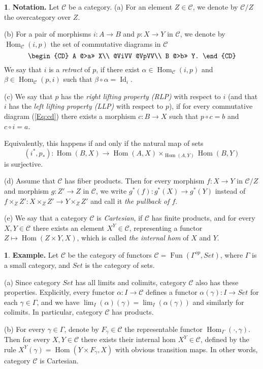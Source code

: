 \documentclass[12pt]{amsart}
\theoremstyle{plain}
\theoremstyle{definition}
\newtheorem{Emp}[Thm]{}
\numberwithin{equation}{section}
\newcommand{\cal}[1]{\mathcal{#1}}
\newcommand{\C}[1]{\cal#1}
\newcommand{\form}[1]{(\ref{Eq:#1})}
\newcommand{\Gm}{\Gamma}
\newcommand{\gm}{\gamma}
\newcommand{\al}{\alpha}
\newcommand{\Fun}{\operatorname{Fun}}
\newcommand{\Id}{\operatorname{Id}}
\newcommand{\Hom}{\operatorname{Hom}}
\begin{document}
\begin{Emp} \label{E:rlp}
{\bf Notation.} Let $\C{C}$ be a category. (a) For an element $Z\in\C{C}$, we denote by 
$\C{C}/Z$ the overcategory over $Z$. 

(b) For a pair of
morphisms $i:A\to B$ and $p:X\to Y$ in $\C{C}$, we denote by
$\Hom_{\C{C}}(i,p)$ the set of commutative diagrams in ${\C{C}}$
%
\begin{equation} \label{Eq:cd}
\begin{CD}
A @>a>> X\\
@ViVV @VpVV\\
B @>b>> Y.
\end{CD}
\end{equation}
%
We say that $i$ is a {\em retract} of $p$, if there exist
$\al\in\Hom_{\C{C}}(i,p)$ and $\beta\in\Hom_{\C{C}}(p,i)$ such
that $\beta\circ\al=\Id_i$.

(c) We say that $p$ has the {\em right lifting property (RLP)}
with respect  to $i$ (and that $i$ has the {\em left lifting
property (LLP)} with respect  to $p$), if for every commutative
diagram \form{cd} there exists a morphism $c:B\to X$ such that
$p\circ c=b$ and $c\circ i=a$.

Equivalently, this happens if and only if the natural map of sets
\[
(i^*,p_*):\Hom(B,X)\to \Hom(A,X)\times_{\Hom(A,Y)}\Hom(B,Y)
\]
is surjective.

(d) Assume that $\C{C}$ has fiber products. Then for every
morphism $f:X\to Y$ in $\C{C}/Z$ and morphism
$g:Z'\to Z$ in $\C{C}$, we write $g^*(f):g^*(X)\to g^*(Y)$ instead of
$f\times_Z Z':X\times_Z Z'\to Y\times_Z Z'$ and call it {\em the
pullback of $f$}.

(e) We say that a category ${\C{C}}$ is {\em Cartesian}, if
${\C{C}}$ has finite products, and for every $X,Y\in {\C{C}}$
there exists an element $X^Y\in {\C{C}}$, representing a
functor $Z\mapsto\Hom(Z\times Y,X)$, which is called {\em the internal hom} of $X$ and $Y$. 
\end{Emp}

\begin{Emp} \label{E:expsh}
{\bf Example.} Let $\C{C}$ be the category of functors
$\C{C}=\Fun(\Gm^{op},Set)$, where $\Gm$ is a small category, and
$Set$ is the category of sets.

(a) Since category $Set$ has all limits and colimits,  category
$\C{C}$ also has these properties. Explicitly, every functor
$\al:I\to\C{C}$ defines a functor $\al(\gm):I\to Set$ for each
$\gm\in\Gm$, and we have $\lim_I(\al)(\gm)=\lim_I(\al(\gm))$ and
similarly for colimits. In particular, category $\C{C}$ has
products.

(b) For every $\gm\in\Gm$, denote by $F_{\gm}\in\C{C}$ the
representable functor $\Hom_{\Gm}(\cdot,\gm)$. Then for every
$X,Y\in\C{C}$ there exists their internal hom $X^Y\in\C{C}$, defined
by the rule $X^Y(\gm)=\Hom(Y\times F_{\gm},X)$ with obvious
transition maps. In other words, category $\C{C}$ is Cartesian.
\end{Emp}
\end{document}
